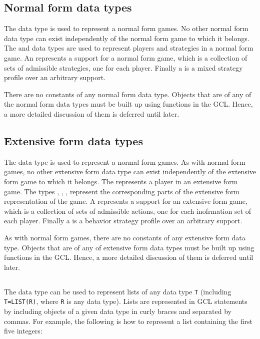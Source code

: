 \subsection{Normal form data types}

The data type  is used to represent a normal form games.  No
other normal form data type can exist independently of the normal form
game to which it belongs.  The  and 
data types are used to represent players and strategies in a normal
form game.  An  represents a support for a normal form
game, which is a collection of sets of admissible strategies, one for
each player.  Finally a  is a mixed strategy profile over
an arbitrary support.

There are no constants of any normal form data type.  Objects that are
of any of the normal form data types must be built up using functions
in the GCL.  Hence, a more detailed discussion of them is deferred
until later.  

\subsection{Extensive form data types}

The data type  is used to represent a normal form games.  As
with normal form games, no other extensive form data type can exist
independently of the extensive form game to which it belongs.  The
 represents a player in an extensive form game.  The
types , , , 
represent the corresponding parts of the extensive form representation
of the game.  A  represents a support for an extensive
form game, which is a collection of sets of admissible actions, one
for each inofrmation set of each player.  Finally a  is a
behavior strategy profile over an arbitrary support.

As with normal form games, there are no constants of any extensive form
data type.  Objects that are of any of extensive form data types must
be built up using functions in the GCL.  Hence, a more detailed
discussion of them is deferred until later.

\subsection{}

The  data type can be used to represent lists of any
data type \verb+T+ (including \verb+T=LIST(R)+, where \verb+R+ is any
data type).  Lists are represented in GCL statements by including
objects of a given data type in curly braces and separated by commas.
For example, the following is how to represent a list containing the
first five integers:

